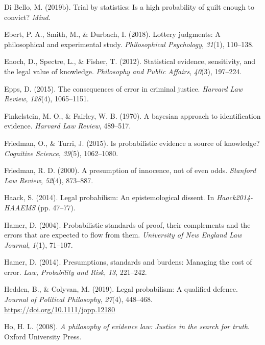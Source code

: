 \documentclass[10pt,dvipsnames,enabledeprecatedfontcommands]{scrartcl}
\begin{document}
\leavevmode\hypertarget{ref-diBello2019}{}%
Di Bello, M. (2019b). Trial by statistics: Is a high probability of
guilt enough to convict? \emph{Mind}.

\leavevmode\hypertarget{ref-ebert2018}{}%
Ebert, P. A., Smith, M., \& Durbach, I. (2018). Lottery judgments: A
philosophical and experimental study. \emph{Philosophical Psychology},
\emph{31}(1), 110--138.

\leavevmode\hypertarget{ref-Enoch2012Statistical}{}%
Enoch, D., Spectre, L., \& Fisher, T. (2012). Statistical evidence,
sensitivity, and the legal value of knowledge. \emph{Philosophy and
Public Affairs}, \emph{40}(3), 197--224.

\leavevmode\hypertarget{ref-epps2015}{}%
Epps, D. (2015). The consequences of error in criminal justice.
\emph{Harvard Law Review}, \emph{128}(4), 1065--1151.

\leavevmode\hypertarget{ref-finkelstein1970bayesian}{}%
Finkelstein, M. O., \& Fairley, W. B. (1970). A bayesian approach to
identification evidence. \emph{Harvard Law Review}, 489--517.

\leavevmode\hypertarget{ref-friedman2015}{}%
Friedman, O., \& Turri, J. (2015). Is probabilistic evidence a source of
knowledge? \emph{Cognitive Science}, \emph{39}(5), 1062--1080.

\leavevmode\hypertarget{ref-Friedman2000presumption}{}%
Friedman, R. D. (2000). A presumption of innocence, not of even odds.
\emph{Stanford Law Review}, \emph{52}(4), 873--887.

\leavevmode\hypertarget{ref-haack2011legal}{}%
Haack, S. (2014). Legal probabilism: An epistemological dissent. In
\emph{Haack2014-HAAEMS} (pp. 47--77).

\leavevmode\hypertarget{ref-hamer2004}{}%
Hamer, D. (2004). Probabilistic standards of proof, their complements
and the errors that are expected to flow from them. \emph{University of
New England Law Journal}, \emph{1}(1), 71--107.

\leavevmode\hypertarget{ref-hamer2014}{}%
Hamer, D. (2014). Presumptions, standards and burdens: Managing the cost
of error. \emph{Law, Probability and Risk}, \emph{13}, 221--242.

\leavevmode\hypertarget{ref-HeddenColyvan2019legal}{}%
Hedden, B., \& Colyvan, M. (2019). Legal probabilism: A qualified
defence. \emph{Journal of Political Philosophy}, \emph{27}(4), 448--468.
\url{https://doi.org/10.1111/jopp.12180}

\leavevmode\hypertarget{ref-ho2008philosophy}{}%
Ho, H. L. (2008). \emph{A philosophy of evidence law: Justice in the
search for truth}. Oxford University Press.
\end{document}
